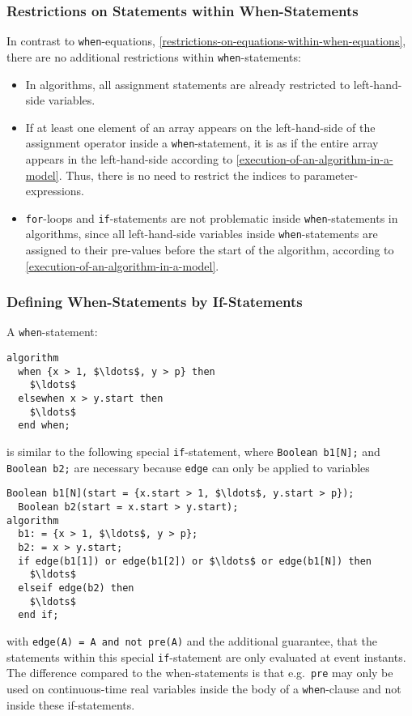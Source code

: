 \subsubsection{Restrictions on Statements within When-Statements}\label{restrictions-on-statements-within-when-statements}

\begin{nonnormative}
In contrast to \lstinline!when!-equations, \cref{restrictions-on-equations-within-when-equations}, there are no additional restrictions within \lstinline!when!-statements:
\begin{itemize}
\item
  In algorithms, all assignment statements are already restricted to left-hand-side variables.
\item
  If at least one element of an array appears on the left-hand-side of the assignment operator inside a \lstinline!when!-statement, it is as if the entire array appears in the left-hand-side according to \cref{execution-of-an-algorithm-in-a-model}.
  Thus, there is no need to restrict the indices to parameter-expressions.
\item
  \lstinline!for!-loops and \lstinline!if!-statements are not problematic inside \lstinline!when!-statements in algorithms, since all left-hand-side variables inside \lstinline!when!-statements are assigned to their pre-values before the start of the algorithm, according to \cref{execution-of-an-algorithm-in-a-model}.
\end{itemize}
\end{nonnormative}

\subsubsection{Defining When-Statements by If-Statements}\label{defining-when-statements-by-if-statements}

A \lstinline!when!-statement:
\begin{lstlisting}[language=modelica]
algorithm
  when {x > 1, $\ldots$, y > p} then
    $\ldots$
  elsewhen x > y.start then
    $\ldots$
  end when;
\end{lstlisting}
is similar to the following special \lstinline!if!-statement, where \lstinline!Boolean b1[N];! and \lstinline!Boolean b2;! are necessary because \lstinline!edge! can only be applied to variables
\begin{lstlisting}[language=modelica]
  Boolean b1[N](start = {x.start > 1, $\ldots$, y.start > p});
  Boolean b2(start = x.start > y.start);
algorithm
  b1: = {x > 1, $\ldots$, y > p};
  b2: = x > y.start;
  if edge(b1[1]) or edge(b1[2]) or $\ldots$ or edge(b1[N]) then
    $\ldots$
  elseif edge(b2) then
    $\ldots$
  end if;
\end{lstlisting}
with \lstinline!edge(A) = A and not pre(A)! and the additional guarantee, that the statements within this special \lstinline!if!-statement are only evaluated at event instants.
The difference compared to the when-statements is that e.g.\ \lstinline!pre! may only be used on continuous-time real variables inside the body of a \lstinline!when!-clause and not inside these if-statements.

